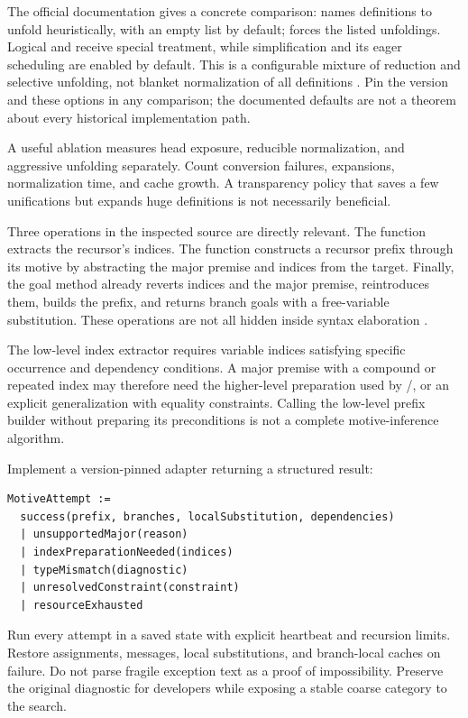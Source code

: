 The official  documentation gives a concrete comparison:
 names definitions to unfold heuristically, with an empty list by
default;  forces the listed unfoldings. Logical  and
 receive special treatment, while  simplification and its
 eager scheduling are enabled by default. This is a configurable
mixture of reduction and selective unfolding, not blanket normalization of
all definitions \cite{sauto}. Pin the version and these options in any
comparison; the documented defaults are not a theorem about every historical
implementation path.

A useful ablation measures head exposure, reducible normalization, and
aggressive unfolding separately. Count conversion failures, expansions,
normalization time, and cache growth. A transparency policy that saves a few
unifications but expands huge definitions is not necessarily beneficial.


Three operations in the inspected source are directly relevant. The function
 extracts the recursor's indices. The function
 constructs a recursor prefix through its motive by
abstracting the major premise and indices from the target. Finally, the goal
method  already reverts indices and the major premise,
reintroduces them, builds the prefix, and returns branch goals with a
free-variable substitution. These operations are not all hidden inside syntax
elaboration \cite{leaninduction}.

The low-level index extractor requires variable indices satisfying specific
occurrence and dependency conditions. A major premise with a compound or
repeated index may therefore need the higher-level preparation used by
/, or an explicit generalization with equality
constraints. Calling the low-level prefix builder without preparing its
preconditions is not a complete motive-inference algorithm.

Implement a version-pinned adapter returning a structured result:
\begin{lstlisting}
MotiveAttempt :=
  success(prefix, branches, localSubstitution, dependencies)
  | unsupportedMajor(reason)
  | indexPreparationNeeded(indices)
  | typeMismatch(diagnostic)
  | unresolvedConstraint(constraint)
  | resourceExhausted
\end{lstlisting}
Run every attempt in a saved state with explicit heartbeat and recursion
limits. Restore assignments, messages, local substitutions, and branch-local
caches on failure. Do not parse fragile exception text as a proof of
impossibility. Preserve the original diagnostic for developers while exposing
a stable coarse category to the search.

